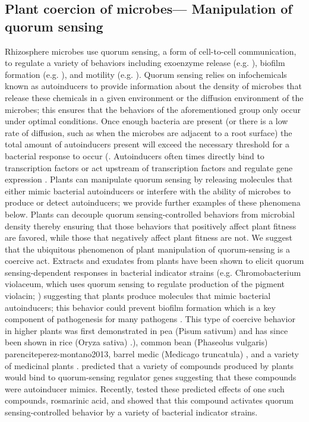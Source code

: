 \subsection{Plant coercion of microbes— Manipulation of quorum sensing} 
Rhizosphere microbes use quorum sensing, a form of cell-to-cell communication, to regulate a variety of behaviors including exoenzyme release (e.g.  \parencite{chernin1998}), biofilm formation (e.g.  \parencite{danhorn2007}), and motility (e.g.  \parencite{kohler2000}). Quorum sensing relies on infochemicals known as autoinducers to provide information about the density of microbes that release these chemicals in a given environment or the diffusion environment of the microbes; this ensures that the behaviors of the aforementioned group only occur under optimal conditions. Once enough bacteria are present (or there is a low rate of diffusion, such as when the microbes are adjacent to a root surface) the total amount of autoinducers present will exceed the necessary threshold for a bacterial response to occur (\parencite{bassler1999,redfield2002}. Autoinducers often times directly bind to transcription factors or act upstream of transcription factors and regulate gene expression  \parencite{engebrecht1987}. Plants can manipulate quorum sensing by releasing molecules that either mimic bacterial autoinducers or interfere with the ability of microbes to produce or detect autoinducers; we provide further examples of these phenomena below. Plants can decouple quorum sensing-controlled behaviors from microbial density thereby ensuring that those behaviors that positively affect plant fitness are favored, while those that negatively affect plant fitness are not. We suggest that the ubiquitous phenomenon of plant manipulation of quorum-sensing is a coercive act. 
Extracts and exudates from plants have been shown to elicit quorum sensing-dependent responses in bacterial indicator strains (e.g. Chromobacterium violaceum, which uses quorum sensing to regulate production of the pigment violacin; \parencite{mcclean1997}) suggesting that plants produce molecules that mimic bacterial autoinducers; this behavior could prevent biofilm formation which is a key component of pathogenesis for many pathogens  \parencite{perez-montano2013}. This type of coercive behavior in higher plants was first demonstrated in pea (Pisum sativum)  \parencite{teplitski2000} and has since been shown in rice (Oryza sativa)  \parencite{degrassi2007,perez-montano2013}.), common bean (Phaseolus vulgaris)  ~\\parencite{perez-montano2013}, barrel medic (Medicago truncatula)  \parencite{gao2003}, and a variety of medicinal plants  \parencite{tolmacheva2014}. \parencite{annapoorani2012} predicted that a variety of compounds produced by plants would bind to quorum-sensing regulator genes suggesting that these compounds were autoinducer mimics. Recently, \parencite{corral-lugo2016} tested these predicted effects of one such compounds, rosmarinic acid, and showed that this compound activates quorum sensing-controlled behavior by a variety of bacterial indicator strains.
